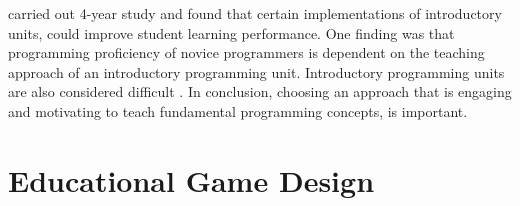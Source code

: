 \documentclass[a4paper,11.5pt]{report}
\numberwithin{figure}{section}
\numberwithin{table}{section}
\numberwithin{equation}{section}
\numberwithin{equation}{section}
\begin{document}
\citet{Koulouri2014} carried out 4-year study and found that certain implementations of introductory units, could improve student learning performance. One finding was that programming proficiency of novice programmers is dependent on the teaching approach of an introductory programming unit. Introductory programming units are also considered difficult \citep{watson2014}. In conclusion, choosing an approach that is engaging and motivating to teach fundamental programming concepts, is important.



 








\section{Educational Game Design}
\end{document}

